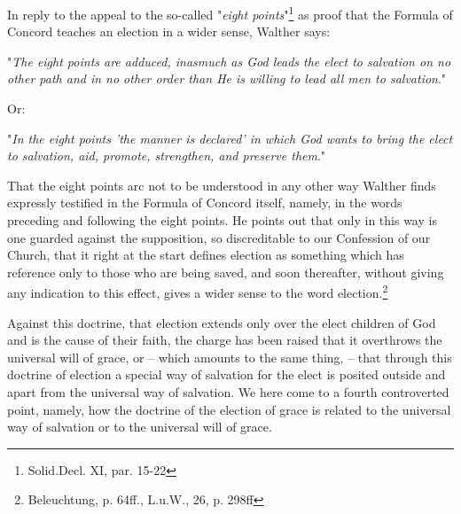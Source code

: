 In reply to the appeal to the so-called "\textit{eight points}"\footnote{Solid.Decl. XI, par. 15-22} as proof that the Formula of Concord teaches an election in a wider sense, Walther says: \begin{displayquote}"\textit{The eight points are adduced, inasmuch as God leads the elect to salvation on no other path and in no other order than He is willing to lead all men to salvation}."\end{displayquote} Or: \begin{displayquote}"\textit{In the eight points 'the manner is declared' in which God wants to bring the elect to salvation, aid, promote, strengthen, and preserve them}."\end{displayquote} That the eight points arc not to be understood in any other way Walther finds expressly testified in the Formula of Concord itself, namely, in the words preceding and following the eight points. He points out that only in this way is one guarded against the supposition, so discreditable to our Confession of our Church, that it right at the start defines election as something which has reference only to those who are being saved, and soon thereafter, without giving any indication to this effect, gives a wider sense to the word election.\footnote{Beleuchtung, p. 64ff., L.u.W., 26, p. 298ff}

Against this doctrine, that election extends only over the elect children of God and is the cause of their faith, the charge has been raised that it overthrows the universal will of grace, or – which amounts to the same thing, – that through this doctrine of election a special way of salvation for the elect is posited outside and apart from the universal way of salvation. We here come to a fourth controverted point, namely, how the doctrine of the election of grace is related to the universal way of salvation or to the universal will of grace.

